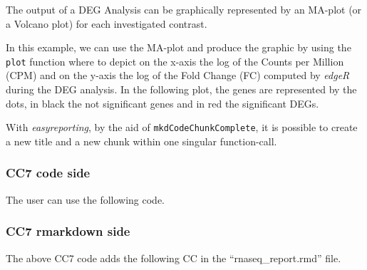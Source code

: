 \documentclass[]{article}
\newenvironment{Shaded}{\begin{snugshade}}{\end{snugshade}}
\newcommand{\CharTok}[1]{\textcolor[rgb]{0.31,0.60,0.02}{#1}}
\newcommand{\DataTypeTok}[1]{\textcolor[rgb]{0.13,0.29,0.53}{#1}}
\newcommand{\DecValTok}[1]{\textcolor[rgb]{0.00,0.00,0.81}{#1}}
\newcommand{\KeywordTok}[1]{\textcolor[rgb]{0.13,0.29,0.53}{\textbf{#1}}}
\newcommand{\NormalTok}[1]{#1}
\newcommand{\StringTok}[1]{\textcolor[rgb]{0.31,0.60,0.02}{#1}}
\begin{document}
The output of a DEG Analysis can be graphically represented by an
MA-plot (or a Volcano plot) for each investigated contrast.

In this example, we can use the MA-plot and produce the graphic by using
the \texttt{plot} function where to depict on the x-axis the log of the
Counts per Million (CPM) and on the y-axis the log of the Fold Change
(FC) computed by \emph{edgeR} during the DEG analysis. In the following
plot, the genes are represented by the dots, in black the not
significant genes and in red the significant DEGs.

With \emph{easyreporting}, by the aid of \texttt{mkdCodeChunkComplete},
it is possible to create a new title and a new chunk within one singular
function-call.

\hypertarget{cc7-code-side}{%
\subsubsection{CC7 code side}\label{cc7-code-side}}

The user can use the following code.

\begin{Shaded}
\end{Shaded}

\hypertarget{cc7-rmarkdown-side}{%
\subsubsection{CC7 rmarkdown side}\label{cc7-rmarkdown-side}}

The above CC7 code adds the following CC in the ``rnaseq\_report.rmd''
file.
\end{document}
